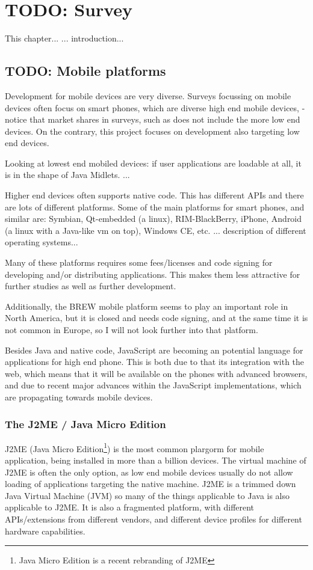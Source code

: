 \chapter{TODO: Survey}
This chapter...
... introduction...

\section{TODO: Mobile platforms}

Development for mobile devices are very diverse.
Surveys focussing on mobile devices often focus on smart phones, which are diverse high end mobile devices, - notice that market shares in surveys, such as \cite{smartphonesurvey} does not include the more low end devices.
On the contrary, this project focuses on development also targeting low end devices.

Looking at lowest end mobiled devices: if user applications are loadable at all, it is in the shape of Java Midlets.
...

Higher end devices often supports native code.
This has different APIs and there are lots of different platforms.
Some of the main platforms for smart phones, and similar are:
Symbian, Qt-embedded (a linux), RIM-BlackBerry, iPhone, Android (a linux with a Java-like vm on top), Windows CE, etc.
... description of different operating systems...

Many of these platforms requires some fees/licenses and code signing for developing and/or distributing applications. 
This makes them less attractive for further studies as well as further development.

Additionally, the BREW mobile platform seems to play an important role in North America, but it is closed and needs code signing, and at the same time it is not common in Europe, so I will not look further into that platform.

Besides Java and native code, JavaScript are becoming an potential language for applications for high end phone. 
This is both due to that its integration with the web, which means that it will be available on the phones with advanced browsers,
and due to recent major advances within the JavaScript implementations, which are propagating towards mobile devices.

\subsection{The J2ME / Java Micro Edition}
J2ME (Java Micro Edition\footnote{Java Micro Edition is a recent rebranding of J2ME}) is the most common plargorm for mobile application, being installed in more than a billion devices. 
The virtual machine of J2ME is often the only option, as low end mobile devices usually do not allow loading of applications targeting the native machine.
J2ME is a trimmed down Java Virtual Machine (JVM) so many of the things applicable to Java is also applicable to J2ME. It is also a fragmented platform, with different APIs/extensions from different vendors, and different device profiles for different hardware capabilities.

